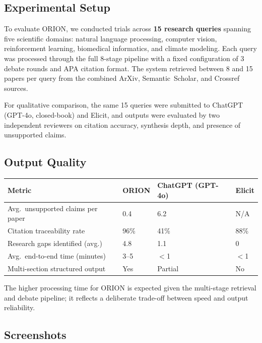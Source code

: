 \documentclass[12pt, a4paper]{article}
\begin{document}
\subsection{Experimental Setup}
To evaluate ORION, we conducted trials across \textbf{15 research queries} spanning five
scientific domains: natural language processing, computer vision, reinforcement learning,
biomedical informatics, and climate modeling. Each query was processed through the full
8-stage pipeline with a fixed configuration of 3 debate rounds and APA citation format.
The system retrieved between 8 and 15 papers per query from the combined ArXiv,
Semantic~Scholar, and Crossref sources.

For qualitative comparison, the same 15 queries were submitted to ChatGPT (GPT-4o,
closed-book) and Elicit, and outputs were evaluated by two independent reviewers on citation
accuracy, synthesis depth, and presence of unsupported claims.

\subsection{Output Quality}

\renewcommand{\arraystretch}{1.5}
\begin{tabular}{|p{5.5cm}|p{2.5cm}|p{3.8cm}|p{2cm}|}
    \hline
    \textbf{Metric} & \textbf{ORION} & \textbf{ChatGPT (GPT-4o)} & \textbf{Elicit} \\
    \hline
    Avg.\ unsupported claims per paper & 0.4 & 6.2 & N/A \\
    \hline
    Citation traceability rate & 96\% & 41\% & 88\% \\
    \hline
    Research gaps identified (avg.) & 4.8 & 1.1 & 0 \\
    \hline
    Avg.\ end-to-end time (minutes) & 3--5 & $<$1 & $<$1 \\
    \hline
    Multi-section structured output & Yes & Partial & No \\
    \hline
\end{tabular}

\vspace{0.4cm}
\noindent The higher processing time for ORION is expected given the multi-stage retrieval
and debate pipeline; it reflects a deliberate trade-off between speed and output reliability.

\subsection{Screenshots}
\end{document}
